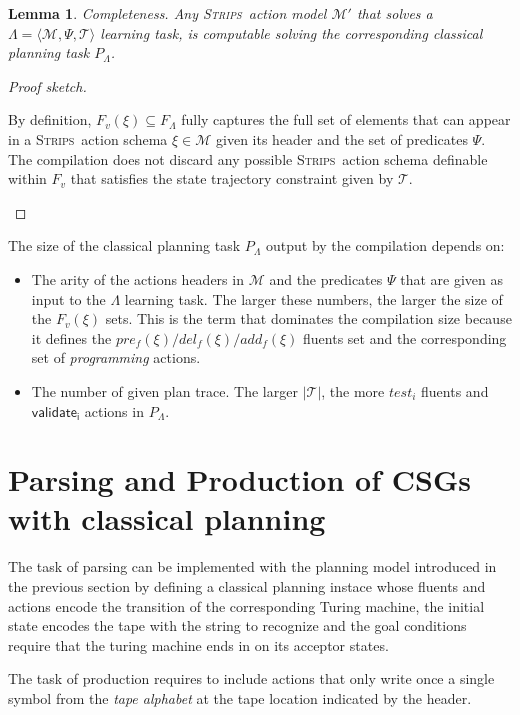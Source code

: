\documentclass[letterpaper]{article} %
\newcommand{\tup}[1]{{\langle #1 \rangle}}
\newcommand{\strips}{\textsc{Strips}}     %
\newtheorem{lemma}[theorem]{Lemma}
\begin{document}
\begin{lemma}
Completeness. Any \strips\ action model $\mathcal{M}'$ that solves a $\Lambda=\tup{\mathcal{M},\Psi,\mathcal{T}}$ learning task, is computable solving the corresponding classical planning task $P_{\Lambda}$.
\end{lemma}

\begin{proof}[Proof sketch]
\begin{small}
By definition, $F_v(\xi)\subseteq F_\Lambda$ fully captures the full set of elements that can appear in a \strips\ action schema $\xi\in\mathcal{M}$ given its header and the set of predicates $\Psi$. The compilation does not discard any possible \strips\ action schema definable within $F_v$ that satisfies the state trajectory constraint given by $\mathcal{T}$.
\end{small}
\end{proof}

The size of the classical planning task $P_{\Lambda}$ output by the compilation depends on:
\begin{itemize}
\item The arity of the actions headers in $\mathcal{M}$ and the predicates $\Psi$ that are given as input to the $\Lambda$ learning task. The larger these numbers, the larger the size of the $F_v(\xi)$ sets. This is the term that dominates the compilation size because it defines the $pre_f(\xi)/del_f(\xi)/add_f(\xi)$ fluents set and the corresponding set of {\em programming} actions.
\item The number of given plan trace. The larger $|\mathcal{T}|$, the more $test_i$ fluents and $\mathsf{validate_{i}}$ actions in $P_{\Lambda}$.
\end{itemize}



\section{Parsing and Production of CSGs with classical planning}
The task of parsing can be implemented with the planning model introduced in the previous section by defining a classical planning instace whose fluents and actions encode the transition of the corresponding Turing machine, the initial state encodes the tape with the string to recognize and the goal conditions require that the turing machine ends in on its acceptor states.

The task of production requires to include actions that only write once a single symbol from the {\em tape alphabet} at the tape location indicated by the header.
\end{document}
